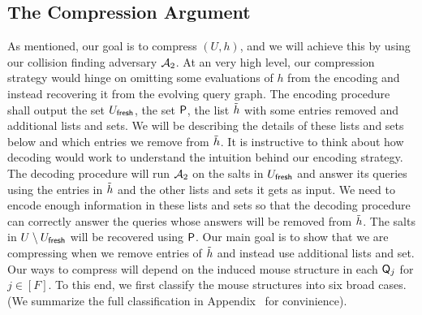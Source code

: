 \subsection{The Compression Argument} \label{sec:compression}
As mentioned, our goal is to compress $(U,h)$, and we will achieve this by using our collision finding adversary $\mathcal{A}_2$. At an very high level, our compression strategy would hinge on omitting some evaluations of $h$ from the encoding and instead recovering it from the evolving query graph.
 The encoding procedure shall output the set $U_\textsf{fresh}$, the set $\mathsf{P}$, the list $\tilde{h}$ with some entries removed and additional lists and sets. We will be describing the details of these lists and sets below and which entries we remove from $\tilde{h}$.
\ifnum{}
It is instructive to think about how decoding would work to understand the intuition behind our encoding strategy. The decoding procedure will run $\mathcal{A}_2$ on the salts in $U_\textsf{fresh}$ and answer its queries using the entries in $\tilde{h}$ and the other lists and sets it gets as input. We need to encode enough information in these lists and sets so that the decoding procedure can correctly answer the queries whose answers will be removed from $\tilde{h}$. The salts in $U \setminus U_\textsf{fresh}$ will be recovered using $\mathsf{P}$.
\fi
Our main goal is to show that we are compressing when we remove entries of $\tilde{h}$ and instead use additional lists and set. Our ways to compress will depend on the induced mouse structure in each $\mathsf{Q}_j$ for $j\in[F]$. To this end, we first classify the mouse structures into six broad cases. (We summarize the full classification in Appendix~ for convinience).
%
